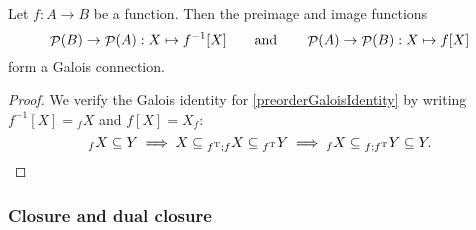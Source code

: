 \begin{proposition}
Let $f: A\to B$ be a function. Then the preimage and image functions
\[ \mathop{\mathcal{P}}(B)\to\mathop{\mathcal{P}}(A): X\mapsto f^{-1}[X] \qquad\text{and}\qquad \mathop{\mathcal{P}}(A)\to\mathop{\mathcal{P}}(B): X\mapsto f[X] \]
form a Galois connection.
\end{proposition}
\begin{proof}
We verify the Galois identity for \ref{preorderGaloisIdentity} by writing $f^{-1}[X] = {_fX}$ and $f[X] = X_f$:
\[ {_fX} \subseteq Y \implies X \subseteq {_{f^{\mathrm{T}};f}X} \subseteq {_{f^{\mathrm{T}}}Y} \implies {_fX} \subseteq {_{f;f^{\mathrm{T}}}Y} \subseteq Y. \]
\end{proof}

\subsubsection{Closure and dual closure}

